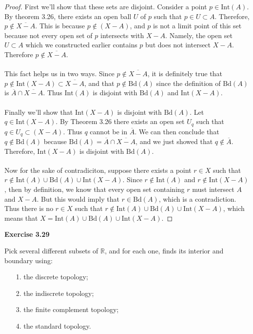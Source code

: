 \documentclass[letterpaper,12pt,twoside]{maths}
\begin{document}
\begin{proof}
    First we'll show that these sets are disjoint. Consider a point $p
    \in \text{Int}(A).$ By theorem 3.26, there exists an open
    ball $U$ of $p$ such that $p \in U \subset A$. Therefore,
    $p \notin \overline{X-A}$. This is because $p \notin (X-A)$, and
    $p$ is not a limit point of this set because not every open set of
    $p$ intersects with $X-A$. Namely, the open set $U \subset A$
    which we constructed earlier 
    contains $p$ but does not intersect $X-A$. Therefore $p \notin
    \overline{X-A}$. \\
    \\
    This fact helps us in two ways. Since $p \notin \overline{X-A}$,
    it is definitely true that $p \notin \text{Int}(X-A) \subset
    \overline{X - A}$, and that $p \notin \text{Bd}(A)$ since the
    definition of $\text{Bd}(A)$ is $\overline{A} \cap
    \overline{X-A}.$ Thus $\text{Int}(A)$ is disjoint with
    $\text{Bd}(A)$ and $\text{Int}(X-A).$ \\
    \\
    Finally we'll show that $\text{Int}(X-A)$ is disjoint with
    $\text{Bd}(A)$. Let $q \in \text{Int}(X-A)$. By Theorem 3.26 
    there exists an open set
    $U_q$ such that $q \in U_q \subset (X - A)$. Thus $q$ cannot be in
    $\overline{A}$. We can then conclude that $q \notin \text{Bd}(A)$
    because $\text{Bd}(A) = \overline{A} \cap \overline{X-A}$, and we
    just showed that $q \notin \overline{A}$. Therefore,
    $\text{Int}(X-A)$ is disjoint with $\text{Bd}(A)$. \\
    \\
    Now for the sake of contradiciton, suppose there exists a point $r
    \in X$ such that $r \notin \text{Int}(A) \cup \text{Bd}(A) \cup
    \text{Int}(X - A)$. Since $r \notin \text{Int}(A)$ and $r \notin
    \text{Int}(X - A)$, then by definition, we know that every open
    set containing $r$ must intersect $A$ and $X - A$. But this would
    imply that $r \in \text{Bd}(A)$, which is a contradiction. Thus
    there is no $r \in X$ such that $r \notin \text{Int}(A) \cup
    \text{Bd}(A) \cup \text{Int}(X - A)$, which means that $X =
    \text{Int}(A) \cup \text{Bd}(A) \cup \text{Int}(X - A)$.
\end{proof}

\noindent
\textbf{Exercise 3.29} 

\begin{exercise}[Exercise 3.29] 
    Pick several different subsets of $\mathbb{R}$,
    and for each one, finds its interior and boundary using:
    \begin{itemize}
        \item[1.] the discrete topology;
        \item[2.] the indiscrete topology;
        \item[3.] the finite complement topology;
        \item[4.] the standard topology.
    \end{itemize}
\end{exercise}
\end{document}
